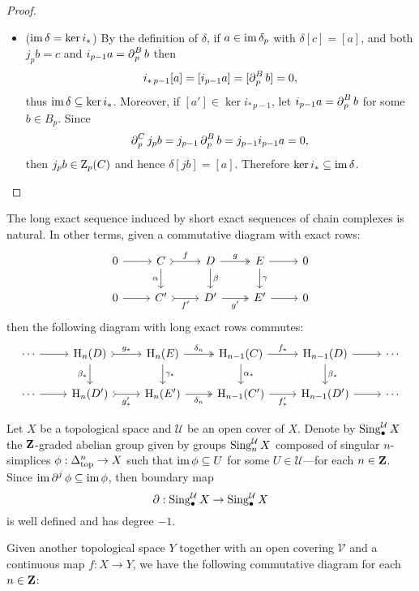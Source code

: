\begin{proof}
\begin{itemize}
\item (\(\operatorname{im} \delta = \ker i_{*}\))  By the definition of \(\delta\), if \(a \in \operatorname{im} \delta_p\)
  with \(\delta[c] = [a]\), and both \(j_p b = c\) and \(i_{p-1} a = \operatorname{\partial}_p^B b\) then
  \[
  i_{*\, p-1}[a] = [i_{p-1} a] = [\operatorname{\partial}_p^B b] = 0,
  \]
  thus \(\operatorname{im} \delta \subseteq \ker i_{*}\). Moreover, if \([a'] \in \ker i_{*\, p-1}\), let
  \(i_{p-1} a = \operatorname{\partial}_p^B b\) for some \(b \in B_p\). Since
  \[
  \operatorname{\partial}_p^C j_p b = j_{p-1} \operatorname{\partial}_p^B b = j_{p-1} i_{p-1} a = 0,
  \]
  then \(j_p b \in \operatorname{Z}_p(C)\) and hence \(\delta[j b] = [a]\). Therefore
  \(\ker i_{*} \subseteq \operatorname{im} \delta\).
\end{itemize}
\end{proof}

\begin{proposition}
\label{prop:long-exact-sequence-construction-is-natural}
The long exact sequence induced by short exact sequences of chain complexes is
natural. In other terms, given a commutative diagram with exact rows:
\[
\begin{tikzcd}
0 \ar[r]
&C \ar[r, "f", tail] \ar[d, "\alpha"']
&D \ar[r, "g", two heads] \ar[d, "\beta"]
&E \ar[r] \ar[d, "\gamma"]
&0
\\
0 \ar[r]
&C' \ar[r, "f'"', tail]
&D' \ar[r, "g'"', two heads]
&E' \ar[r]
&0
\end{tikzcd}
\]
then the following diagram with long exact rows commutes:
\[
\begin{tikzcd}
\cdots \ar[r]
&\Hmlg_n(D) \ar[r, "g_{*}", tail] \ar[d, "\beta_{*}"']
&\Hmlg_n(E) \ar[r, "\delta_n", two heads] \ar[d, "\gamma_{*}"]
&\Hmlg_{n-1}(C) \ar[r, "f_{*}"] \ar[d, "\alpha_{*}"]
&\Hmlg_{n-1}(D) \ar[r] \ar[d, "\beta_{*}"]
&\cdots
\\
\cdots \ar[r]
&\Hmlg_n(D') \ar[r, "g_{*}'"', tail]
&\Hmlg_n(E') \ar[r, "\delta_n"', two heads]
&\Hmlg_{n-1}(C') \ar[r, "f_{*}'"']
&\Hmlg_{n-1}(D') \ar[r]
&\cdots
\end{tikzcd}
\]
\end{proposition}

\begin{definition}
\label{def:cover-singular-simplicial-complex}
Let \(X\) be a topological space and \(\mathcal{U}\) be an open cover of \(X\). Denote by
\(\operatorname{Sing}_{\bullet}^{\mathcal{U}} X\) the \(\mathbf{Z}\)-graded abelian group given by groups
\(\operatorname{Sing}_n^{\mathcal{U}} X\) composed of singular \(n\)-simplices \(\phi: \Delta_{\text{top}}^n \to X\)
such that \(\operatorname{im} \phi \subseteq U\) for some \(U \in \mathcal{U}\)---for each \(n \in \mathbf{Z}\). Since \(\operatorname{im}
\operatorname{\partial}^j \phi \subseteq \operatorname{im} \phi\), then boundary map
\[
\operatorname{\partial}: \operatorname{Sing}_{\bullet}^{\mathcal{U}} X \to \operatorname{Sing}_{\bullet}^{\mathcal{U}} X
\]
is well defined and has degree \(-1\).

Given another topological space \(Y\) together with an open covering \(\mathcal{V}\) and a
continuous map \(f: X \to Y\), we have the following commutative diagram for each
\(n \in \mathbf{Z}\):
\end{definition}






